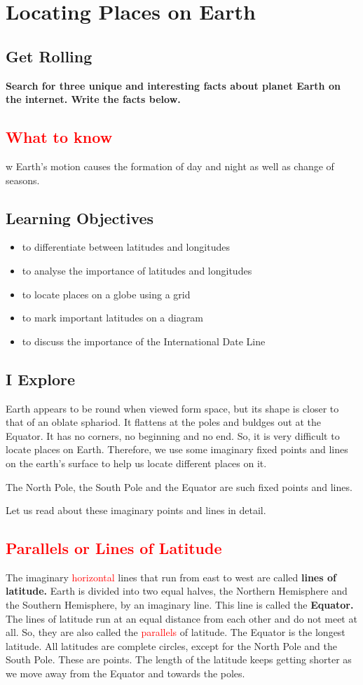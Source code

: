 \chapter{Locating Places on Earth}
\section{Get Rolling}
\textbf{Search for three unique and interesting facts about planet Earth on the internet. Write the facts below.}
\section{\textcolor{red}{What to know}}w
Earth's motion causes the formation of day and night as well as change of seasons.
\section{\textbf{Learning Objectives}}
\begin{itemize}
    \item to differentiate between latitudes and longitudes
    \item to analyse the importance of latitudes and longitudes
    \item to locate places on a globe using a grid
    \item to mark important latitudes on a diagram
    \item to discuss the importance of the International Date Line
\end{itemize}
\section{I Explore}
Earth appears to be round when viewed form space, but its shape is closer to that of an oblate sphariod. It flattens at the poles and buldges out at the Equator. It has no corners, no beginning and no end. So, it is very difficult to locate places on Earth. Therefore, we use some imaginary fixed points and lines on the earth's surface to help us locate different places on it.
\vspace{0.1in}
\par
The North Pole, the South Pole and the Equator are such fixed points and lines.
\vspace{0.1in}
\par
Let us read about these imaginary points and lines in detail.
\section{\textcolor{red}{Parallels or Lines of Latitude}}
The imaginary \textcolor{red}{horizontal} lines that run from east to west are called \textbf{lines of latitude.} Earth is divided into two equal halves, the Northern Hemisphere and the Southern Hemisphere, by an imaginary line. This line is called the \textbf{Equator.} The lines of latitude run at an equal distance from each other and do not meet at all. So, they are also called the \textcolor{red}{parallels} of latitude. The Equator is the longest latitude. All latitudes are complete circles, except for the North Pole and the South Pole. These are points. The length of the latitude keeps getting shorter as we move away from the Equator and towards the poles.
